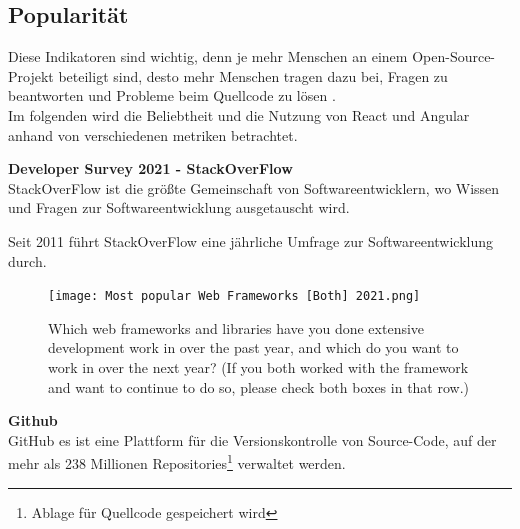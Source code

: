 \subsection{Popularität}
Diese Indikatoren sind wichtig, denn je mehr Menschen an einem Open-Source-Projekt beteiligt sind, desto mehr Menschen tragen dazu bei, Fragen zu beantworten und Probleme beim Quellcode zu lösen {\cite{LIN1}}.
\\
Im folgenden wird die Beliebtheit und die Nutzung von React und Angular anhand von verschiedenen metriken betrachtet.

\begin{flushleft}
  \textbf{Developer Survey 2021 - StackOverFlow}\\
  StackOverFlow ist die größte Gemeinschaft von Softwareentwicklern, wo Wissen und Fragen zur Softwareentwicklung ausgetauscht wird.

  Seit 2011 führt StackOverFlow eine jährliche Umfrage zur Softwareentwicklung durch.

  \begin{figure}[h]
    \centering
    \texttt{[image: Most popular Web Frameworks [Both] 2021.png]}
    \caption{ Which web frameworks and libraries have you done extensive development work in over the past year, and which do you want to work in over the next year? (If you both worked with the framework and want to continue to do so, please check both boxes in that row.) {\cite{SO01}}}

  \end{figure}
\end{flushleft}


\begin{flushleft}
  \textbf{Github}\\
  GitHub es ist eine Plattform für die Versionskontrolle von Source-Code, auf der mehr als 238 Millionen Repositories\footnote{Ablage für Quellcode gespeichert wird} verwaltet werden{\cite{GH07}}.
\end{flushleft}

